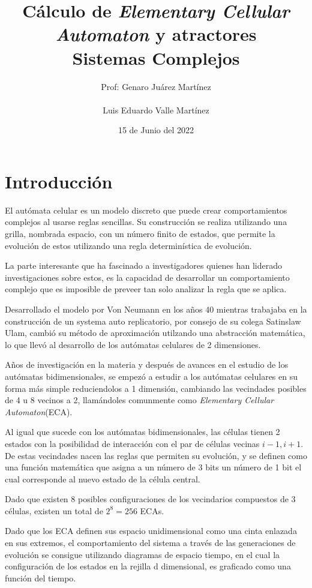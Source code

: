 \documentclass[]{article}
\title{Cálculo de \textit{Elementary Cellular Automaton} y atractores \\\hfill\break Sistemas Complejos}
\author{Prof: Genaro Juárez Martínez \\ \\ Luis Eduardo Valle Martínez}
\date{15 de Junio del 2022}
\begin{document}
	\maketitle
	
	\section{Introducción}
		El autómata celular es un modelo discreto que puede crear comportamientos complejos al usarse reglas sencillas. Su construcción se realiza utilizando una grilla, nombrada espacio, con un número finito de estados, que permite la evolución de estos utilizando una regla determinística de evolución.
		
		\hfill\break
		\justifying
		La parte interesante que ha fascinado a investigadores quienes han liderado investigaciones sobre estos, es la capacidad de desarrollar un comportamiento complejo que es imposible de preveer tan solo analizar la regla que se aplica.
		
		\hfill\break
		\justifying
		Desarrollado el modelo por Von Neumann en los años 40 mientras trabajaba en la construcción de un systema auto replicatorio, por consejo de su colega Satinslaw Ulam, cambió su método de aproximación utilzando una abstracción matemática, lo que llevó al desarrollo de los autómatas celulares de 2 dimensiones.
		
		\hfill\break
		\justifying
		Años de investigación en la materia y después de avances en el estudio de los autómatas bidimensionales, se empezó a estudir a los autómatas celulares en su forma más simple reduciendolos a 1 dimensión, cambiando las vecindades posibles de 4 u 8 vecinos a 2, llamándoles comunmente como \textit{Elementary Cellular Automaton}(ECA).
		
		\hfill\break
		\justifying
		Al igual que sucede con los autómatas bidimensionales, las células tienen 2 estados con la posibilidad de interacción con el par de células vecinas $i-1,i+1$. De estas vecindades nacen las reglas que permiten su evolución, y se definen como una función matemática que asigna a un número de 3 bits un número de 1 bit el cual corresponde al nuevo estado de la célula central.
		
		\hfill\break
		\justifying
		Dado que existen 8 posibles configuraciones de los vecindarios compuestos de 3 células, existen un total de $2^8=256$ ECAs.
		
		\hfill\break
		\justifying
		Dado que los ECA definen sus espacio unidimensional como una cinta enlazada en sus extremos, el comportamiento del sistema a través de las generaciones de evolución se consigue utilizando diagramas de espacio tiempo, en el cual la configuración de los estados en la rejilla d dimensional, es graficado como una función del tiempo.
		
\end{document}
